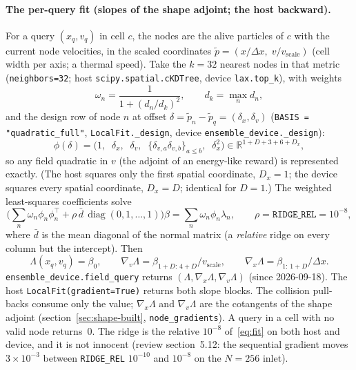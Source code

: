 \documentclass[11pt,a4paper]{article}
\numberwithin{equation}{section}
\newcommand{\R}{\mathbb{R}}
\newcommand{\code}[1]{\texttt{#1}}
\newcommand{\Lam}{\Lambda}
\begin{document}
\paragraph{The per-query fit (slopes of the shape adjoint; the host backward).}
\label{sec:field-knn}
For a query $(x_q, v_q)$ in cell $c$, the nodes are the alive particles of $c$ with
the current node velocities, in the scaled coordinates
$\tilde p = (x/\Delta x,\; v/v_{\mathrm{scale}})$ (cell width per axis; a thermal speed).
Take the $k = 32$ nearest nodes in that metric (\code{neighbors=32}; host
\code{scipy.spatial.cKDTree}, device \code{lax.top\_k}), with weights
\begin{equation}
\label{eq:knn-weights}
\omega_n = \frac{1}{1 + (d_n / d_k)^2}, \qquad d_k = \max_n d_n ,
\end{equation}
and the design row of node $n$ at offset $\delta = \tilde p_n - \tilde p_q =
(\delta_x, \delta_v)$ (\code{BASIS = "quadratic\_full"}, \code{LocalFit.\_design},
device \code{ensemble\_device.\_design}):
\begin{equation}
\label{eq:design}
\phi(\delta) = \big(1,\;\; \delta_x,\;\; \delta_v,\;\; \{\delta_{v,a}\delta_{v,b}\}_{a \le b},\;\; \delta_x^2\big)
\in \R^{1 + D + 3 + 6 + D_x},
\end{equation}
so any field quadratic in $v$ (the adjoint of an energy-like reward) is represented
exactly.  (The host squares only the first spatial coordinate, $D_x = 1$; the device
squares every spatial coordinate, $D_x = D$; identical for $D = 1$.)  The weighted
least-squares coefficients solve
\begin{equation}
\label{eq:fit}
\Big(\textstyle\sum_n \omega_n \phi_n \phi_n^{\top} + \rho\, \bar d\, \operatorname{diag}(0, 1, \dots, 1)\Big)\beta
 = \sum_n \omega_n \phi_n \lambda_n,
\qquad \rho = \code{RIDGE\_REL} = 10^{-8},
\end{equation}
where $\bar d$ is the mean diagonal of the normal matrix (a \emph{relative} ridge on
every column but the intercept).  Then
\begin{equation}
\label{eq:field-value}
\Lam(x_q, v_q) = \beta_0, \qquad
\nabla_v \Lam = \beta_{1+D:\,4+D} / v_{\mathrm{scale}}, \qquad
\nabla_x \Lam = \beta_{1:\,1+D} / \Delta x .
\end{equation}
\code{ensemble\_device.field\_query} returns $(\Lam, \nabla_x \Lam, \nabla_v \Lam)$
(since 2026-09-18).  The host
\code{LocalFit(gradient=True)} returns both slope blocks.  The collision pull-backs
consume only the value; $\nabla_x \Lam$ and $\nabla_v \Lam$ are the cotangents of the
shape adjoint (section~\ref{sec:shape-built}, \code{node\_gradients}).  A query in a cell
with no valid node returns~0.
The ridge is the relative $10^{-8}$ of~\eqref{eq:fit} on both host and device, and it is
not innocent (review section~5.12: the sequential gradient moves $3\times10^{-3}$ between
\code{RIDGE\_REL} $10^{-10}$ and $10^{-8}$ on the $N = 256$ inlet).
\end{document}
